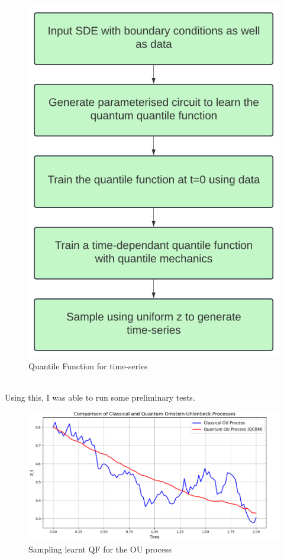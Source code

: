 \documentclass[12pt]{article}
\numberwithin{equation}{section}
\begin{document}
\begin{figure}[ht!]
    \centering
    \includegraphics[scale=0.40]{qf.png}
    \caption{Quantile Function for time-series}
\end{figure}
\\Using this, I was able to run some preliminary tests.
\begin{figure}[h]
    \centering
    \includegraphics[scale=0.7]{Quantile1.png}
    \caption{Sampling learnt QF for the OU process}
\end{figure}
\end{document}
